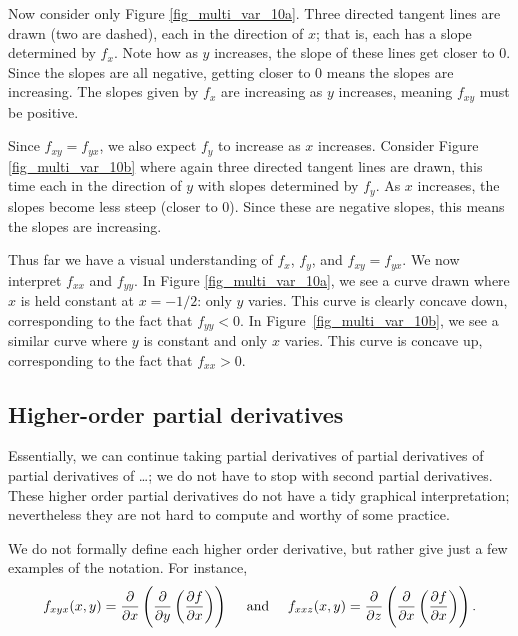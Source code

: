 \begin{example}
Now consider only Figure \ref{fig_multi_var_10a}. Three directed tangent lines are drawn (two are dashed), each in the direction of $x$; that is, each has a slope determined by $f_x$. Note how as $y$ increases, the slope of these lines get closer to $0$. Since the slopes are all negative, getting closer to 0 means the slopes are increasing. The slopes given by $f_x$ are increasing as $y$ increases, meaning $f_{xy}$ must be positive. 

Since $f_{xy}=f_{yx}$, we also expect $f_y$ to increase as $x$ increases. Consider Figure \ref{fig_multi_var_10b} where again three directed tangent lines are drawn, this time each in the direction of $y$ with slopes determined by $f_y$. As $x$ increases, the slopes become less steep (closer to 0). Since these are negative slopes, this means the slopes are increasing.

Thus far we have a visual understanding of $f_x$, $f_y$, and $f_{xy}=f_{yx}$. We now interpret $f_{xx}$ and $f_{yy}$. In Figure \ref{fig_multi_var_10a}, we see a curve drawn where $x$ is held constant at $x=-1/2$: only $y$ varies. This curve is clearly concave down, corresponding to the fact that $f_{yy}<0$. In Figure~\ref{fig_multi_var_10b}, we see a similar curve where $y$ is constant and only $x$ varies. This curve is concave up, corresponding to the fact that $f_{xx}>0$.
\end{example}

\subsection{Higher-order partial derivatives}
Essentially, we can continue taking partial derivatives of partial derivatives of partial derivatives of \ldots; we do not have to stop with second partial derivatives. These higher order partial derivatives do not have a tidy graphical interpretation; nevertheless they are not hard to compute and worthy of some practice. 

We do not formally define each higher order derivative, but rather give just a few examples of the notation. For instance, 
$$f_{xyx}(x,y)  =\frac{\partial}{\partial x}\left(\frac{\partial}{\partial y}\left(\frac{\partial f}{\partial x}\right)\right) \quad \text{ and }\quad
f_{xxz}(x,y)  =\frac{\partial}{\partial z}\left(\frac{\partial}{\partial x}\left(\frac{\partial f}{\partial x}\right)\right)  .$$

